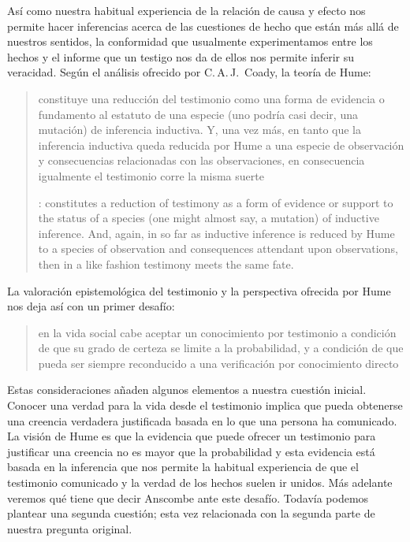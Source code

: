 Así como nuestra habitual experiencia de la relación de causa y efecto nos
permite hacer inferencias acerca de las cuestiones de hecho que están más allá
de nuestros sentidos, la conformidad que usualmente experimentamos entre los
hechos y el informe que un testigo nos da de ellos nos permite inferir su
veracidad. Según el análisis ofrecido por C.\,A.\,J.~Coady, la teoría de Hume:
\blockquote[{\cite[79]{coady1992test}}: constitutes a reduction of testimony as
a form of evidence or support to the status of a species (one might almost say,
a mutation) of inductive inference. And, again, in so far as inductive inference
is reduced by Hume to a species of observation and consequences attendant upon
observations, then in a like fashion testimony meets the same fate.]{constituye
  una reducción del testimonio como una forma de evidencia o fundamento al
  estatuto de una especie (uno podría casi decir, una mutación) de inferencia
  inductiva. Y, una vez más, en tanto que la inferencia inductiva queda reducida
  por Hume a una especie de observación y consecuencias relacionadas con las
  observaciones, en consecuencia igualmente el testimonio corre la misma suerte}
La valoración epistemológica del testimonio y la perspectiva ofrecida por Hume
nos deja así con un primer desafío:
\blockquote[{\cite[294]{prades2015testimonio}}]{en la vida social cabe aceptar
  un conocimiento por testimonio a condición de que su grado de certeza se
  limite a la probabilidad, y a condición de que pueda ser siempre reconducido a
  una verificación por conocimiento directo}.

Estas consideraciones añaden algunos elementos a nuestra cuestión inicial.
Conocer una verdad para la vida desde el testimonio implica que pueda obtenerse
una creencia verdadera justificada basada en lo que una persona ha comunicado.
La visión de Hume es que la evidencia que puede ofrecer un testimonio para
justificar una creencia no es mayor que la probabilidad y esta evidencia está
basada en la inferencia que nos permite la habitual experiencia de que el
testimonio comunicado y la verdad de los hechos suelen ir unidos. Más adelante
veremos qué tiene que decir Anscombe ante este desafío. Todavía podemos plantear
una segunda cuestión; esta vez relacionada con la segunda parte de nuestra
pregunta original.

